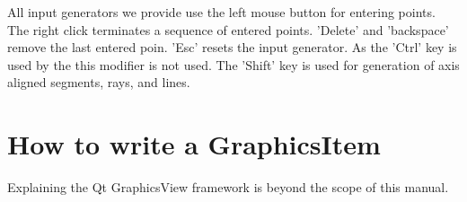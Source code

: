 All input generators we provide use the left mouse button for entering points.
The right click terminates a sequence of entered points. 'Delete' and 'backspace'
remove the last entered poin. 'Esc' resets the input generator.  As the 'Ctrl' key
is used by the  this modifier is not used.  The 'Shift'
key is used for generation of axis aligned segments, rays, and lines. 

\section{How to write a GraphicsItem} 

Explaining the Qt GraphicsView framework is beyond the scope of this manual.

